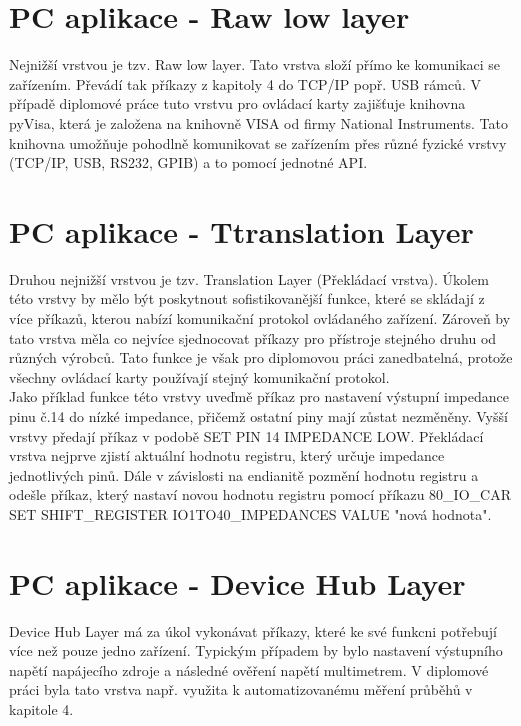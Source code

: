\section{PC aplikace - Raw low layer}
Nejnižší vrstvou je tzv. Raw low layer. Tato vrstva složí přímo ke komunikaci se zařízením. Převádí tak příkazy z kapitoly 4 do TCP/IP popř. USB rámců.
V případě diplomové práce tuto vrstvu pro ovládací karty zajišťuje knihovna pyVisa, která je založena na knihovně VISA od firmy National Instruments.
Tato knihovna umožňuje pohodlně komunikovat se zařízením přes různé fyzické vrstvy (TCP/IP, USB, RS232, GPIB) a to pomocí jednotné API.\\


\section{PC aplikace - Ttranslation Layer}
Druhou nejnižší vrstvou je tzv. Translation Layer (Překládací vrstva). Úkolem této vrstvy by mělo být poskytnout sofistikovanější funkce, které se skládají z více příkazů,
kterou nabízí komunikační protokol ovládaného zařízení. Zároveň by tato vrstva měla co nejvíce sjednocovat příkazy pro přístroje stejného druhu od různých výrobců.
Tato funkce je však pro diplomovou práci zanedbatelná, protože všechny ovládací karty používají stejný komunikační protokol.\\

Jako příklad funkce této vrstvy uveďmě příkaz pro nastavení výstupní impedance pinu č.14 do nízké impedance, přičemž ostatní piny mají zůstat nezměněny.
Vyšší vrstvy předají příkaz v podobě SET PIN 14 IMPEDANCE LOW. Překládací vrstva nejprve zjistí aktuální hodnotu registru, který určuje impedance jednotlivých pinů.
Dále v závislosti na endianitě pozmění hodnotu registru a odešle příkaz, který nastaví novou hodnotu registru pomocí příkazu
80\_IO\_CAR SET SHIFT\_REGISTER IO1TO40\_IMPEDANCES VALUE "nová hodnota".\\


\section{PC aplikace - Device Hub Layer}
Device Hub Layer má za úkol vykonávat příkazy, které ke své funkcni potřebují více než pouze jedno zařízení.
Typickým případem by bylo nastavení výstupního napětí napájecího zdroje a následné ověření napětí multimetrem.
V diplomové práci byla tato vrstva např. využita k automatizovanému měření průběhů v kapitole 4.\\

